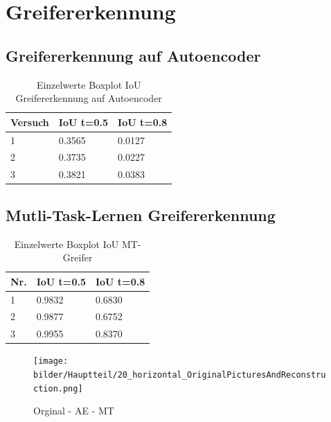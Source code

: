 \chapter{Greifererkennung}
\label{appendix:Greifererkennung}

\section{Greifererkennung auf Autoencoder}
\label{appendix:GreifererkennungAufAutoencoder}

\begin{table}[ht]
	\centering
	\begin{tabularx}{\textwidth}{lll}
		\textbf{Versuch}  & \textbf{IoU t=0.5} & \textbf{IoU t=0.8}  	 \\ \hline 
		1 & 0.3565 & 0.0127 \\
		2 & 0.3735 & 0.0227 \\
		3 & 0.3821 & 0.0383 \\ 
	\end{tabularx}
	\caption{Einzelwerte Boxplot IoU Greifererkennung auf Autoencoder}
	\label{table:EinzelwerteBoxplotIoUGreifererkennungaufAutoencoder}
\end{table}

\section{Mutli-Task-Lernen Greifererkennung}
\label{appendix:MutliTaskGreifererkennung}

\begin{table}[ht]
	\centering
	\begin{tabularx}{\textwidth}{lll}
		\textbf{Nr.}  & \textbf{IoU t=0.5} & \textbf{IoU t=0.8}  	 \\ \hline 
		1 & 0.9832 & 0.6830 \\
		2 & 0.9877 & 0.6752 \\
		3 & 0.9955 & 0.8370 \\

	\end{tabularx}
	\caption{Einzelwerte Boxplot IoU MT-Greifer}
	\label{table:EinzelwerteBoxplotIoUMTGreifer}
\end{table}



\begin{figure}[h]
	\centering
	\texttt{[image: bilder/Hauptteil/20\_horizontal\_OriginalPicturesAndReconstruction.png]}
	\caption{Orginal -  AE - MT}
	\label{img:AppendixReconstruction}	
\end{figure}


